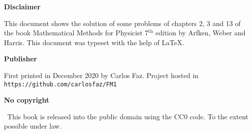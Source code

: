 


\textbf{Disclaimer}

This document shows the solution of some problems of chapters 2, 3 and 13 of the book Mathematical Methods for Physicist 7$^{\text{th}}$ edition by Arfken, Weber and Harris. This document was typeset with the help of \LaTeX.

\vspace{3mm}

\textbf{Publisher}

First printed in December 2020 by Carlos Faz. Project hosted in \\ \texttt{https://github.com/carlosfaz/FM1}

\vspace{3mm}

\textbf{No copyright}

\cczero\ This book is released into the public domain using the CC0 code. To the extent possible under law.



\restoregeometry